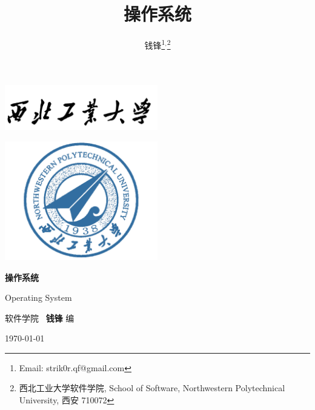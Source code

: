 \documentclass[10pt,UTF8]{book} %
\title{\textbf{操作系统}}
\author{钱锋\thanks{Email: strik0r.qf@gmail.com}${}^,$\thanks{
    西北工业大学软件学院, School of Software, Northwestern Polytechnical University, 西安 710072
}}
\begin{document}

\pagestyle{empty}
\begin{titlepage}
    \thispagestyle{empty}
    \centering
        \vspace*{2cm}
        \includegraphics[width=0.5\textwidth]{pic/npu_2.png}\par
        \vspace{1em}
        \includegraphics[width=0.5\textwidth]{pic/npu_1.png}\par
    \vspace{1em}
        \begin{center}
            \Huge \heiti \textbf{操作系统}

            Operating System
        \end{center}
        \vspace{17em}
        \begin{center}
        \songti
        \kaishu 软件学院 \, \heiti\textbf{钱锋} \quad \songti 编
        \vspace{0.5em}

    \today
    \end{center}
\end{titlepage}
\cleardoublepage
\maketitle
\cleardoublepage

\frontmatter
\newpage
\pagestyle{plain}
\makeatother

\pagestyle{plain}
{\tableofcontents}
\newpage
\thispagestyle{empty}
\cleardoublepage %


\makeatletter
\let\ps@plain\ps@empty
\makeatother
\end{document}
